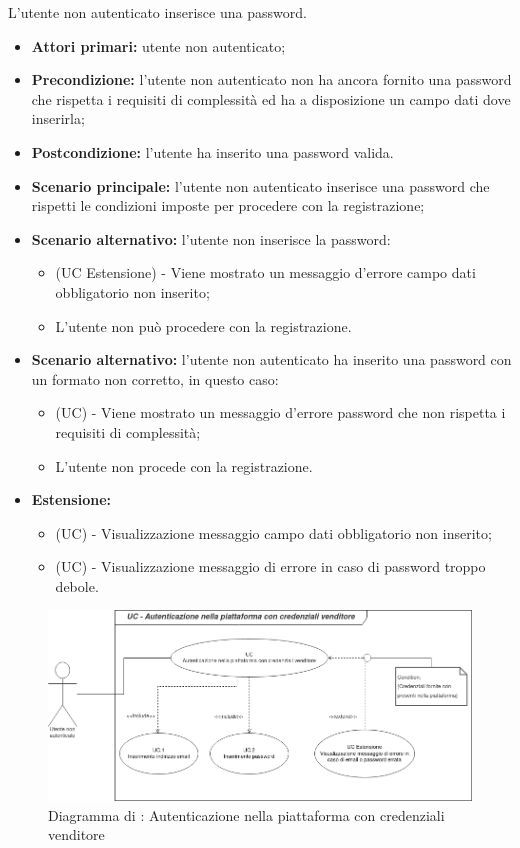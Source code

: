 L'utente non autenticato inserisce una password.
\begin{itemize}
	\item \textbf{Attori primari:} utente non autenticato;
	\item \textbf{Precondizione:} l'utente non autenticato non ha ancora fornito una password che rispetta i requisiti di complessità ed ha a disposizione un campo dati dove inserirla;
	\item \textbf{Postcondizione:} l'utente ha inserito una password valida.
	\item \textbf{Scenario principale:} l'utente non autenticato inserisce una password che rispetti le condizioni imposte per procedere con la registrazione;
	\item \textbf{Scenario alternativo:} l'utente non inserisce la password:
	\begin{itemize}
		\item (UC Estensione) - Viene mostrato un messaggio d'errore campo dati obbligatorio non inserito;
		\item L'utente non può procedere con la registrazione.
	\end{itemize}
	\item \textbf{Scenario alternativo:} l'utente non autenticato ha inserito una password con un formato non corretto, in questo caso:
	\begin{itemize}
		\item (UC) - Viene mostrato un messaggio d'errore password che non rispetta i requisiti di complessità;
		\item L'utente non procede con la registrazione.
	\end{itemize}
	\item \textbf{Estensione:}
	\begin{itemize}
		\item (UC) - Visualizzazione messaggio campo dati obbligatorio non inserito;
		\item (UC) - Visualizzazione messaggio di errore in caso di password troppo debole.
	\end{itemize}
\end{itemize}

\begin{figure}[H]
    \centering
    \includegraphics[scale=0.6]{Immagini/DiagrammiUC/AccessoVenditore.png}
    \caption{Diagramma di \actualUC: Autenticazione nella piattaforma con credenziali venditore} 
    \label{fig:LoginVenditore}
\end{figure}


